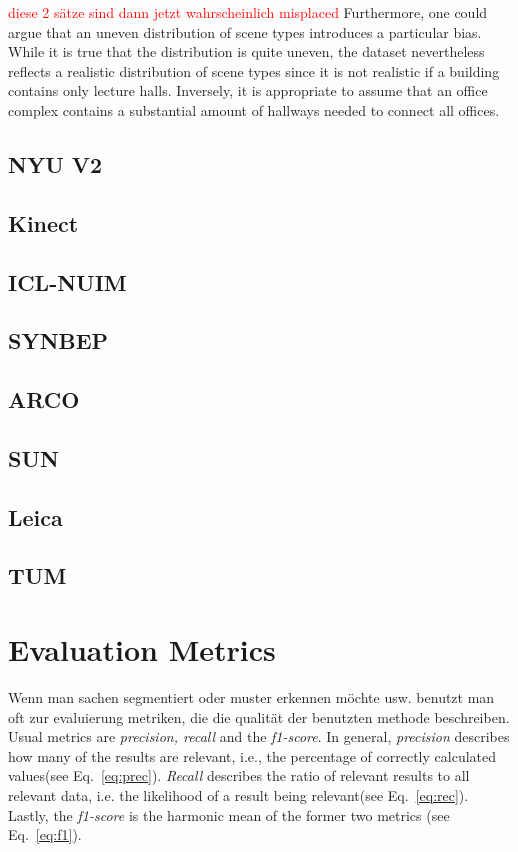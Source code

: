 \documentclass[main.tex]{subfiles}
\begin{document}
\textcolor{red}{diese 2 sätze sind dann jetzt wahrscheinlich misplaced}
Furthermore, one could argue that an uneven distribution of scene types introduces a particular bias. While it is true that the distribution is quite uneven, the dataset nevertheless reflects a realistic distribution of scene types since
it is not realistic if a building contains only lecture halls. Inversely, it is appropriate to assume that an office complex contains a substantial amount of hallways needed to connect all offices.

\subsection{NYU V2}
\subsection{Kinect}
\subsection{ICL-NUIM}
\subsection{SYNBEP}
\subsection{ARCO}
\subsection{SUN}
\subsection{Leica}
\subsection{TUM}


\section{Evaluation Metrics}
\label{sec:metrics}
Wenn man sachen segmentiert oder muster erkennen möchte usw. benutzt man oft zur evaluierung metriken, die die qualität der benutzten methode beschreiben.
Usual metrics are \textit{precision, recall} and the \textit{f1-score}.
In general, \textit{precision} describes how many of the results are relevant, i.e., the percentage of correctly calculated values(see Eq.~\ref{eq:prec}). \textit{Recall} describes the ratio of relevant results to all relevant data, i.e.
the likelihood of a result being relevant(see Eq.~\ref{eq:rec}). Lastly, the \textit{f1-score} is the harmonic mean of the former two metrics (see Eq.~\ref{eq:f1}).
\end{document}
